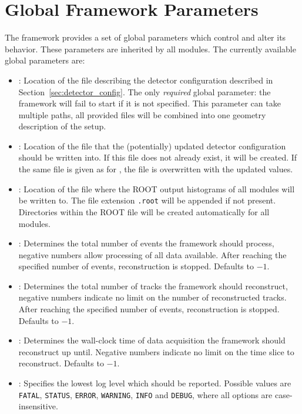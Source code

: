 \section{Global Framework Parameters}
\label{sec:framework_parameters}
The \corry framework provides a set of global parameters which control and alter its behavior. These parameters are inherited by all modules.
The currently available global parameters are:

\begin{itemize}
\item {}: Location of the file describing the detector configuration described in Section~\ref{sec:detector_config}.
The only \textit{required} global parameter: the framework will fail to start if it is not specified.
This parameter can take multiple paths, all provided files will be combined into one geometry description of the setup.
\item {}: Location of the file that the (potentially) updated detector configuration should be written into. If this file does not already exist, it will be created. If the same file is given as for , the file is overwritten with the updated values.
\item {}: Location of the file where the ROOT output histograms of all modules will be written to. The file extension \texttt{.root} will be appended if not present. Directories within the ROOT file will be created automatically for all modules.
\item {}: Determines the total number of events the framework should process, negative numbers allow processing of all data available.
After reaching the specified number of events, reconstruction is stopped.
Defaults to $-1$.
\item {}: Determines the total number of tracks the framework should reconstruct, negative numbers indicate no limit on the number of reconstructed tracks.
After reaching the specified number of events, reconstruction is stopped.
Defaults to $-1$.
\item {}: Determines the wall-clock time of data acquisition the framework should reconstruct up until. Negative numbers indicate no limit on the time slice to reconstruct.
Defaults to $-1$.
\item {}: Specifies the lowest log level which should be reported.
Possible values are \texttt{FATAL}, \texttt{STATUS}, \texttt{ERROR}, \texttt{WARNING}, \texttt{INFO} and \texttt{DEBUG}, where all options are case-insensitive.

\end{itemize}
